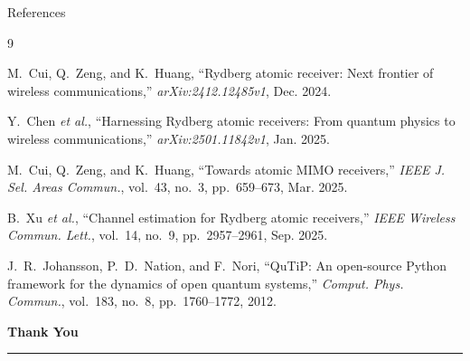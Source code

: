 \documentclass[10pt,xcolor=x11names,compress,aspectratio=169]{beamer}
\begin{document}
\begin{frame}{References}
\scriptsize
\begin{thebibliography}{9}

M.~Cui, Q.~Zeng, and K.~Huang, ``Rydberg atomic receiver: Next frontier of wireless
communications,'' \textit{arXiv:2412.12485v1}, Dec. 2024.

Y.~Chen \textit{et al.}, ``Harnessing Rydberg atomic receivers: From quantum physics to
wireless communications,'' \textit{arXiv:2501.11842v1}, Jan. 2025.

M.~Cui, Q.~Zeng, and K.~Huang, ``Towards atomic MIMO receivers,'' \textit{IEEE J. Sel.
Areas Commun.}, vol.~43, no.~3, pp.~659--673, Mar. 2025.

B.~Xu \textit{et al.}, ``Channel estimation for Rydberg atomic receivers,''
\textit{IEEE Wireless Commun. Lett.}, vol.~14, no.~9, pp.~2957--2961, Sep. 2025.

J.~R.~Johansson, P.~D.~Nation, and F.~Nori, ``QuTiP: An open-source Python framework for the
dynamics of open quantum systems,'' \textit{Comput. Phys. Commun.}, vol.~183, no.~8,
pp.~1760--1772, 2012.

\end{thebibliography}
\end{frame}

\begin{frame}[plain]
\begin{center}
  \vspace{1.5cm}
  {\Huge\textbf{Thank You}}\\[10pt]
  \rule{6cm}{0.5pt}
\end{center}
\end{frame}
\end{document}
